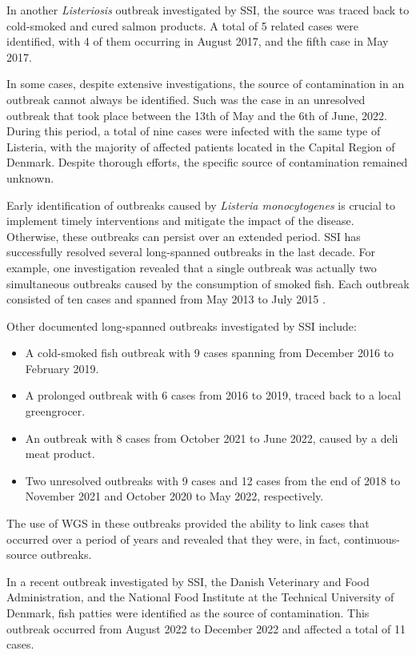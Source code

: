 \documentclass[a4paper,twoside,11pt]{report} %
\theoremstyle{definition}
\theoremstyle{definition}
\theoremstyle{definition}
\theoremstyle{definition}
\theoremstyle{remark}
\begin{document}
In another \textit{Listeriosis} outbreak investigated by SSI, the source was traced back to cold-smoked and cured salmon products. A total of 5 related cases were identified, with 4 of them occurring in August 2017, and the fifth case in May 2017.

In some cases, despite extensive investigations, the source of contamination in an outbreak cannot always be identified. Such was the case in an unresolved outbreak that took place between the 13th of May and the 6th of June, 2022. During this period, a total of nine cases were infected with the same type of Listeria, with the majority of affected patients located in the Capital Region of Denmark. Despite thorough efforts, the specific source of contamination remained unknown.

Early identification of outbreaks caused by \textit{Listeria monocytogenes} is crucial to implement timely interventions and mitigate the impact of the disease. Otherwise, these outbreaks can persist over an extended period. SSI has successfully resolved several long-spanned outbreaks in the last decade. For example, one investigation revealed that a single outbreak was actually two simultaneous outbreaks caused by the consumption of smoked fish. Each outbreak consisted of ten cases and spanned from May 2013 to July 2015 \autocite{Gillesberg_2016}.

Other documented long-spanned outbreaks investigated by SSI include:

\begin{itemize}
  \item A cold-smoked fish outbreak with 9 cases spanning from December 2016 to February 2019.
  \item A prolonged outbreak with 6 cases from 2016 to 2019, traced back to a local greengrocer.
  \item An outbreak with 8 cases from October 2021 to June 2022, caused by a deli meat product.
  \item Two unresolved outbreaks with 9 cases and 12 cases from the end of 2018 to November 2021 and October 2020 to May 2022, respectively.
\end{itemize}

The use of WGS in these outbreaks provided the ability to link cases that occurred over a period of years and revealed that they were, in fact, continuous-source outbreaks.

In a recent outbreak investigated by SSI, the Danish Veterinary and Food Administration, and the National Food Institute at the Technical University of Denmark, fish patties were identified as the source of contamination. This outbreak occurred from August 2022 to December 2022 and affected a total of 11 cases.
\end{document}
